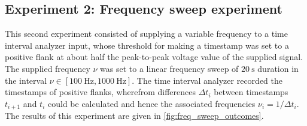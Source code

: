 \documentclass{report}
\numberwithin{tm}{section}
\begin{document}
\subsection{Experiment 2: Frequency sweep experiment}
This second experiment consisted of supplying a variable frequency to a time interval analyzer input, whose threshold for making a timestamp was set to a positive flank at about half the peak-to-peak voltage value of the supplied signal. The supplied frequency $\nu$ was set to a linear frequency sweep of $\SI{20}{\second}$ duration in the interval $\nu \in [\SI{100}{\hertz}, \SI{1000}{\hertz}]$. The time interval analyzer recorded the timestamps of positive flanks, wherefrom differences $\Delta t_i$ between timestamps $t_{i+1}$ and $t_i$ could be calculated and hence the associated frequencies $\nu_i = 1/\Delta t_i$. The results of this experiment are given in \cref{fig:freq_sweep_outcomes}.
\end{document}
